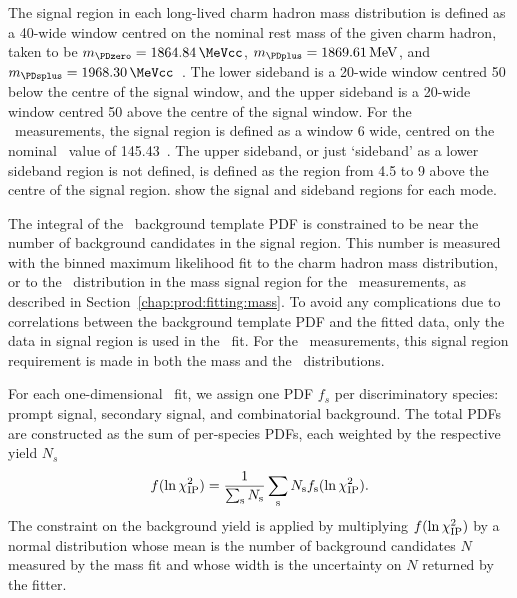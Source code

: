 The signal region in each long-lived charm hadron mass distribution is defined 
as a \SI{40}{\MeVcc}-wide window centred on the nominal rest mass of the given 
charm hadron, taken to be $m_{\PDzero} = \SI{1864.84}{\MeVcc}$, $m_{\PDplus} = 
\SI{1869.61}{MeV}$, and $m_{\PDsplus} = \SI{1968.30}{\MeVcc}$~\cite{PDG2014}.
The lower sideband is a \SI{20}{\MeVcc}-wide window centred \SI{50}{\MeVcc} 
below the centre of the signal window, and the upper sideband is a 
\SI{20}{\MeVcc}-wide window centred \SI{50}{\MeVcc} above the centre of the 
signal window.
For the \PDstarp\ measurements, the signal region is defined as a window 
\SI{6}{\MeVcc} wide, centred on the nominal \deltam\ value of 
\SI{145.43}{\MeVcc}~\cite{PDG2014}.
The upper sideband, or just `sideband' as a lower sideband region is not 
defined, is defined as the region from \SI{4.5}{\MeVcc} to \SI{9}{\MeVcc} above 
the centre of the signal region.
show the signal and sideband regions for each mode.

The integral of the \lnipchisq\ background template \ac{PDF} is constrained to 
be near the number of background candidates in the signal region.
This number is measured with the binned maximum likelihood fit to the charm 
hadron mass distribution, or to the \deltam\ distribution in the \PDzero mass 
signal region for the \PDstarp\ measurements, as described in 
Section~\ref{chap:prod:fitting:mass}.
To avoid any complications due to correlations between the background template 
\ac{PDF} and the fitted data, only the data in signal region is used in the 
\lnipchisq\ fit.
For the \PDstarp\ measurements, this signal region requirement is made in both 
the \PDzero mass and the \deltam\ distributions.

For each one-dimensional \lnipchisq\ fit, we assign one \ac{PDF} $f_{s}$ per 
discriminatory species: prompt signal, secondary signal, and combinatorial 
background.
The total \acp{PDF} are constructed as the sum of per-species \acp{PDF}, 
each weighted by the respective yield $N_{s}$
\begin{equation}
  f(\ln\chi^2_{\textnormal{IP}}) = \frac{1}{\sum_{\textnormal{s}} N_{\textnormal{s}}}
                  \sum_{\text{s}} N_{\text{s}}
                  f_{\text{s}}(\ln\chi^2_{\textnormal{IP}}).
\end{equation}
The constraint on the background yield is applied by multiplying 
$f(\ln\chi^2_{\textnormal{IP}})$ by a normal distribution whose mean is the number of background 
candidates $N$ measured by the mass fit and whose width is the uncertainty on 
$N$ returned by the fitter.

